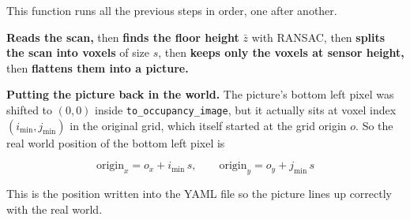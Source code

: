 \documentclass[11pt]{article}
\begin{document}
This function runs all the previous steps in order, one after another.

\textbf{Reads the scan,} then \textbf{finds the floor height} $\bar z$ with RANSAC, then \textbf{splits the scan into voxels} of size $s$, then \textbf{keeps only the voxels at sensor height,} then \textbf{flattens them into a picture.}

\textbf{Putting the picture back in the world.} The picture's bottom left pixel was shifted to $(0,0)$ inside \texttt{to\_occupancy\_image}, but it actually sits at voxel index $(i_{\min}, j_{\min})$ in the original grid, which itself started at the grid origin $o$. So the real world position of the bottom left pixel is

\[
\text{origin}_{x} = o_x + i_{\min} \, s, \qquad
\text{origin}_{y} = o_y + j_{\min} \, s
\]

This is the position written into the YAML file so the picture lines up correctly with the real world.
\end{document}
